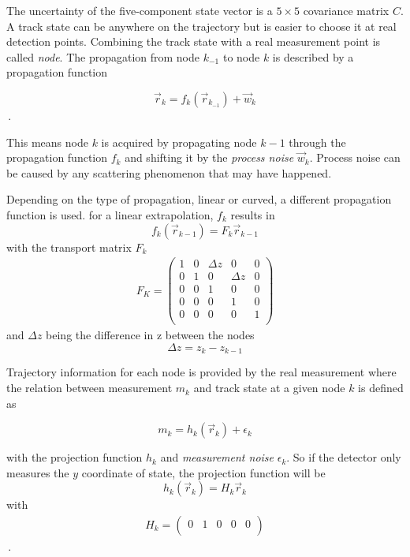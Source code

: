 The uncertainty of the five-component state vector is a $5\times5$ covariance matrix $C$.
A track state can be anywhere on the trajectory but is easier to choose it at real detection points. Combining the track state with a real measurement point is called \textit{node}.
The propagation from node $k_{-1}$ to node $k$ is described by a propagation function

\begin{equation}
  \vec{r}_k = f_k(\vec{r}_{k_{-1}}) + \vec{w}_k
\end{equation}\,.

This means node $k$ is acquired by propagating node $k-1$ through the propagation function $f_k$ and shifting it by the \textit{process noise} $\vec{w}_k$.
Process noise can be caused by any scattering phenomenon that may have happened.

Depending on the type of propagation, linear or curved, a different propagation function is used.
for a linear extrapolation, $f_k$ results in
\begin{equation}
  f_k \left(\vec{r}_{k-1}\right) = F_k \vec{r}_{k-1}
\end{equation}
with the transport matrix $F_k$
\begin{gather}
  F_K = \begin{pmatrix}
    1 & 0 & \Delta z & 0 & 0 \\
    0 & 1 & 0 & \Delta z & 0 \\
    0 & 0 & 1 & 0 & 0 \\
    0 & 0 & 0 & 1 & 0 \\
    0 & 0 & 0 & 0 & 1 \\
  \end{pmatrix}
\end{gather}
and $\Delta z$ being the difference in z between the nodes
\begin{equation}
  \Delta z = z_k - z_{k-1}
\end{equation}


Trajectory information for each node is provided by the real measurement where the relation between measurement $m_k$ and track state at a given node $k$ is defined as

\begin{equation}
  m_k = h_k(\vec{r}_k) + \epsilon_k
\end{equation}

with the projection function $h_k$ and \textit{measurement noise} $\epsilon_k$.
So if the detector only measures the $y$ coordinate of state, the projection function
will be
\begin{equation}
  h_k(\vec{r}_k) = H_k \vec{r}_k
\end{equation}
with
\begin{gather}
  H_k = \begin{pmatrix}
    0 & 1 & 0 & 0 & 0 \\
  \end{pmatrix}
\end{gather}\,.

